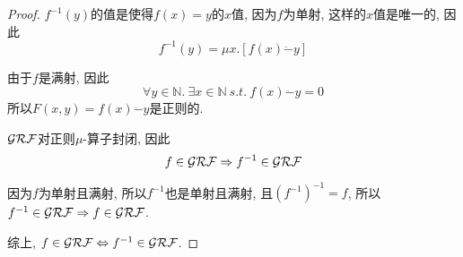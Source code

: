 \begin{proof}
    $f^{-1}(y)$的值是使得$f(x)=y$的$x$值, 因为$f$为单射, 这样的$x$值是唯一的, 因此
    $$f^{-1}(y)=\mu x.[f(x)\ddot{-}y]$$

    由于$f$是满射, 因此$$\forall y\in\mathbb{N}. \ \exists x\in\mathbb{N} \ s.t. \  f(x)\ddot{-}y=0$$
    所以$F(x,y)=f(x)\ddot{-}y$是正则的.

    $\mathcal{GRF}$对正则$\mu$-算子封闭, 因此
    $$f\in\mathcal{GRF}\Rightarrow f^{-1}\in\mathcal{GRF}$$

    因为$f$为单射且满射, 所以$f^{-1}$也是单射且满射, 且$(f^{-1})^{-1}=f$, 所以$f^{-1}\in\mathcal{GRF}\Rightarrow f\in\mathcal{GRF}$.

    综上, $f\in\mathcal{GRF}\Leftrightarrow f^{-1}\in\mathcal{GRF}$.
\end{proof}
